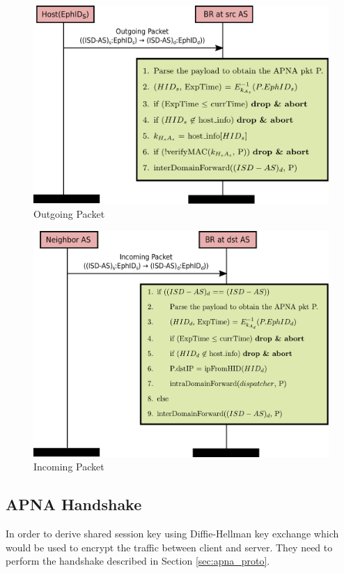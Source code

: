 \begin{figure}[th!!]
\centering
\hspace*{2cm}\includegraphics[scale=0.5]{Figures/overlay_src.pdf}
\decoRule
\caption[APNA Overlay Outgoing Packet]{Outgoing Packet}
\label{fig:overlay_src}
\end{figure}

\begin{figure}[th!!]
\centering
\hspace*{2cm}\includegraphics[scale=0.5]{Figures/overlay_dst.pdf}
\decoRule
\caption[APNA Overlay Incoming Packet]{Incoming Packet}
\label{fig:overlay_dst}
\end{figure}

\subsection{APNA Handshake}
In order to derive shared session key using Diffie-Hellman key exchange which would be used to encrypt the traffic between client and server. They need to perform the handshake described in Section \ref{sec:apna_proto}. 

